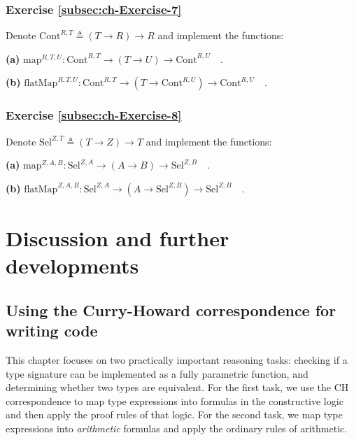 \subsubsection{Exercise \label{subsec:ch-Exercise-7}\ref{subsec:ch-Exercise-7}}

Denote $\text{Cont}^{R,T}\triangleq\left(T\rightarrow R\right)\rightarrow R$
and implement the functions:

\textbf{(a)} $\text{map}^{R,T,U}:\text{Cont}^{R,T}\rightarrow(T\rightarrow U)\rightarrow\text{Cont}^{R,U}\quad.$

\textbf{(b)} $\text{flatMap}^{R,T,U}:\text{Cont}^{R,T}\rightarrow(T\rightarrow\text{Cont}^{R,U})\rightarrow\text{Cont}^{R,U}\quad.$

\subsubsection{Exercise \label{subsec:ch-Exercise-8}\ref{subsec:ch-Exercise-8}}

Denote $\text{Sel}^{Z,T}\triangleq\left(T\rightarrow Z\right)\rightarrow T$
and implement the functions:

\textbf{(a)} $\text{map}^{Z,A,B}:\text{Sel}^{Z,A}\rightarrow\left(A\rightarrow B\right)\rightarrow\text{Sel}^{Z,B}\quad.$

\textbf{(b)} $\text{flatMap}^{Z,A,B}:\text{Sel}^{Z,A}\rightarrow(A\rightarrow\text{Sel}^{Z,B})\rightarrow\text{Sel}^{Z,B}\quad.$

\section{Discussion and further developments\label{sec:Discussion-curry-howard}}

\subsection{Using the Curry-Howard correspondence for writing code}

This chapter focuses on two practically important reasoning tasks:
checking if a type signature can be implemented as a fully parametric
function, and determining whether two types are equivalent. For the
first task, we use the CH correspondence to map type expressions into
formulas in the constructive logic and then apply the proof rules
of that logic. For the second task, we map type expressions into \emph{arithmetic}
formulas and apply the ordinary rules of arithmetic.


